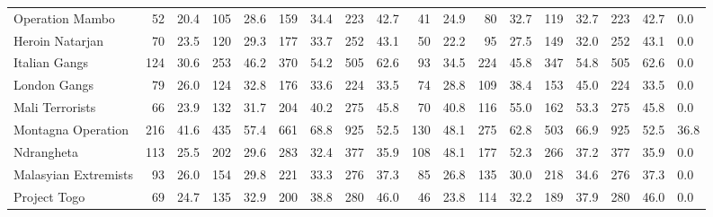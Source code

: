 \begin{tabular}{lrrrrrrrrrrrrrrrrl}
Operation Mambo      &                52 &  20.4 &  105 &  28.6 &  159 &  34.4 &  223 &  42.7 &               41 &   24.9 &   80 &   32.7 &  119 &   32.7 &  223 &  42.7 &        0.0 \\
Heroin Natarjan      &                70 &  23.5 &  120 &  29.3 &  177 &  33.7 &  252 &  43.1 &               50 &   22.2 &   95 &   27.5 &  149 &   32.0 &  252 &  43.1 &        0.0 \\
Italian Gangs        &               124 &  30.6 &  253 &  46.2 &  370 &  54.2 &  505 &  62.6 &               93 &   34.5 &  224 &   45.8 &  347 &   54.8 &  505 &  62.6 &        0.0 \\
London Gangs         &                79 &  26.0 &  124 &  32.8 &  176 &  33.6 &  224 &  33.5 &               74 &   28.8 &  109 &   38.4 &  153 &   45.0 &  224 &  33.5 &        0.0 \\
Mali Terrorists      &                66 &  23.9 &  132 &  31.7 &  204 &  40.2 &  275 &  45.8 &               70 &   40.8 &  116 &   55.0 &  162 &   53.3 &  275 &  45.8 &        0.0 \\
Montagna Operation   &               216 &  41.6 &  435 &  57.4 &  661 &  68.8 &  925 &  52.5 &              130 &   48.1 &  275 &   62.8 &  503 &   66.9 &  925 &  52.5 &       36.8 \\
Ndrangheta           &               113 &  25.5 &  202 &  29.6 &  283 &  32.4 &  377 &  35.9 &              108 &   48.1 &  177 &   52.3 &  266 &   37.2 &  377 &  35.9 &        0.0 \\
Malasyian Extremists &                93 &  26.0 &  154 &  29.8 &  221 &  33.3 &  276 &  37.3 &               85 &   26.8 &  135 &   30.0 &  218 &   34.6 &  276 &  37.3 &        0.0 \\
Project Togo         &                69 &  24.7 &  135 &  32.9 &  200 &  38.8 &  280 &  46.0 &               46 &   23.8 &  114 &   32.2 &  189 &   37.9 &  280 &  46.0 &        0.0 \\
\bottomrule
\end{tabular}
